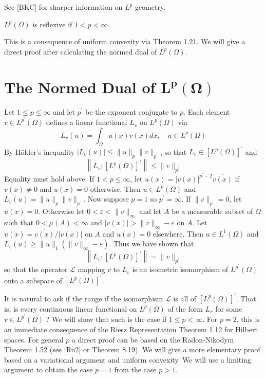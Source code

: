 See [BKC] for sharper information on $L^p$ geometry.

\begin{corollary}\label{cor:2.40}
  $L^p(\Omega)$ is reflexive if $1<p<\infty$.
\end{corollary}
This is a consequence of uniform convexity via Theorem 1.21.
We will give a direct proof after calculating the normed dual of $L^p(\Omega)$.


\section[The Normed Dual of $L^p(\Omega)$]{The Normed Dual of $\bm{L^p(\Omega)}$}


\begin{para}
  Let $1 \leq p \leq \infty$ and let $p^{\prime}$ be the exponent conjugate to $p$.
  Each element $v \in L^{p^{\prime}}(\Omega)$ defines a linear functional
  $L_v$ on $L^p(\Omega)$ via
  \[
  L_v(u)=\int_{\Omega} u(x) v(x) d x, \quad u \in L^p(\Omega)
  \]
  By Hölder's inequality $\left|L_v(u)\right| \leq\|u\|_p\|v\|_{p^{\prime}}$, so that $L_v \in\left[L^p(\Omega)\right]^{\prime}$ and
  \[
  \left\|L_v ;\left[L^p(\Omega)\right]^{\prime}\right\| \leq\|v\|_{p^{\prime}}
  \]
  Equality must hold above. If $1<p \leq \infty$, let $u(x)=|v(x)|^{p^{\prime}-2} \overline{v(x)}$ if $v(x) \neq 0$ and $u(x)=0$ otherwise. Then $u \in L^p(\Omega)$ and $L_v(u)=\|u\|_p\|v\|_{p^{\prime}}$.
  Now suppose $p=1$ so $p^{\prime}=\infty$. If $\|v\|_{p^{\prime}}=0$, let $u(x)=0$. Otherwise let $0<\varepsilon<\|v\|_{\infty}$ and let $A$ be a measurable subset of $\Omega$ such that $0<\mu(A)<\infty$
  and $|v(x)|>\|v\|_{\infty}-\varepsilon$ on $A$. Let $u(x)=\overline{v(x)} /|v(x)|$ on $A$ and $u(x)=0$ elsewhere. Then $u \in L^1(\Omega)$ and $L_v(u) \geq\|u\|_1\left(\|v\|_{\infty}-\varepsilon\right)$. Thus we have shown that
  \[
  \left\|L_v ;\left[L^p(\Omega)\right]^{\prime}\right\|=\|v\|_{p^{\prime}}
  \]
  so that the operator $\mathcal{L}$ mapping $v$ to $L_v$ is an isometric isomorphism of $L^{p^{\prime}}(\Omega)$ onto a subspace of $\left[L^p(\Omega)\right]^{\prime}$.
\end{para}


\begin{para}
  It is natural to ask if the range if the isomorphism $\mathcal{L}$ is all of $\left[L^p(\Omega)\right]^{\prime}$. That is, is every continuous linear functional on $L^p(\Omega)$ of the form $L_v$ for some $v \in L^{p^{\prime}}(\Omega)$ ? We will show that such is the case if $1 \leq p<\infty$. For $p=2$, this is an immediate consequence of the Riesz Representation Theorem 1.12 for Hilbert spaces. For general $p$ a direct proof can be based on the Radon-Nikodym Theorem 1.52 (see [Ru2] or Theorem 8.19). We will give a more elementary proof based on a variational argument and uniform convexity. We will use a limiting argument to obtain the case $p=1$ from the case $p>1$.
\end{para}



